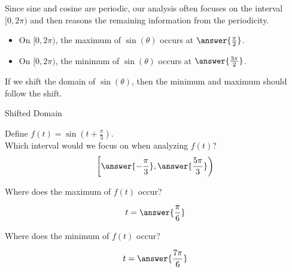 \documentclass{ximera}
\author{Lee Wayand}
\begin{document}
\begin{exercise}





Since sine and cosine are periodic, our analysis often focuses on the interval $[0, 2\pi)$ and then reasons the remaining information from the periodicity.  \\

\begin{itemize}
\item On $[0, 2\pi)$, the maximum of $\sin(\theta)$ occurs at $\answer{\frac{\pi}{2}}$. 
\item On $[0, 2\pi)$, the minimum of $\sin(\theta)$ occurs at $\answer{\frac{3\pi}{2}}$. 
\end{itemize}




If we shift the domain of $\sin(\theta)$, then the minimum and maximum should follow the shift. \\





\begin{question} Shifted Domain 

Define $f(t) = \sin\left(t + \frac{\pi}{3} \right)$. \\




Which interval would we focus on when analyzing $f(t)$? \\

\[
\left[      \answer{-\frac{\pi}{3}},   \answer{\frac{5\pi}{3}}     \right)
\]




Where does the maximum of $f(t)$ occur?

\[
t = \answer{\frac{\pi}{6}} 
\]





Where does the minimum of $f(t)$ occur?

\[
t = \answer{\frac{7\pi}{6}} 
\]



\end{question}


















\end{exercise}
\end{document}
